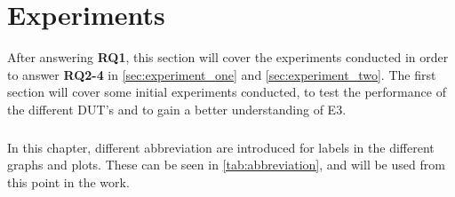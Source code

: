 \chapter{Experiments}\label{ch:experiments}

After answering \textbf{RQ1}, this section will cover the experiments conducted in order to answer  \textbf{RQ2-4} in \cref*{sec:experiment_one} and \cref*{sec:experiment_two}. The first section will cover some initial experiments conducted, to test the performance of the different DUT's and to gain a better understanding of E3.


\paragraph*{}
In this chapter, different abbreviation are introduced for labels in the different graphs and plots. These can be seen in \cref*{tab:abbreviation}, and will be used from this point in the work.






